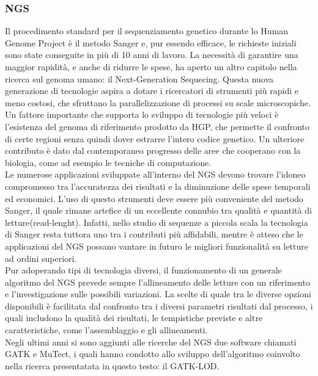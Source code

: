 \subsubsection{NGS}  
Il procedimento standard per il sequenziamento genetico durante lo Human Genome Project è il metodo Sanger e, pur essendo efficace, le richieste iniziali sono state conseguite in più di 10 anni di lavoro. La necessità di garantire una maggior rapidità, e anche di ridurre le spese, ha aperto un altro capitolo nella ricerca sul genoma umano: il Next-Generation Sequecing. Questa nuova generazione di tecnologie aspira a dotare i ricercatori di strumenti più rapidi e meno costosi, che sfruttano la parallelizzazione di processi su scale microscopiche. \\
Un fattore importante che supporta lo sviluppo di tecnologie più veloci è l'esistenza del genoma di riferimento prodotto da HGP, che permette il confronto di certe regioni senza quindi dover estrarre l'intero codice genetico. Un ulteriore contributo è dato dal contemporaneo progresso delle aree che cooperano con la biologia, come ad esempio le tecniche di computazione.\\
Le numerose applicazioni sviluppate all'interno del NGS devono trovare l'idoneo compromesso tra l'accuratezza dei risultati e la diminuzione delle spese temporali ed economici. L'uso di questo strumenti deve essere più conveniente del metodo Sanger, il quale rimane artefice di un eccellente connubio tra qualità e quantità di letture(read-lenght). Infatti, nello studio di sequenze a piccola scala la tecnologia di Sanger resta tuttora uno tra i contributi più affidabili, mentre è atteso che le applicazioni del NGS possano vantare in futuro le migliori funzionalità su letture ad ordini superiori.\\
Pur adoperando tipi di tecnologia diversi, il funzionamento di un generale algoritmo del NGS prevede sempre l'allineamento delle letture con un riferimento e l'investigazione sulle possibili variazioni. La scelte di quale tra le diverse opzioni disponibili è facilitata dal confronto tra i diversi parametri risultati dal processo, i quali includono la qualità dei risultati, le tempistiche previste e altre caratteristiche, come l'assemblaggio e gli allineamenti. \\
Negli ultimi anni si sono aggiunti alle ricerche del NGS due software chiamati GATK e MuTect, i quali hanno condotto allo sviluppo dell'algoritmo coinvolto nella ricerca presentatata in questo testo: il GATK-LOD.     
                 

